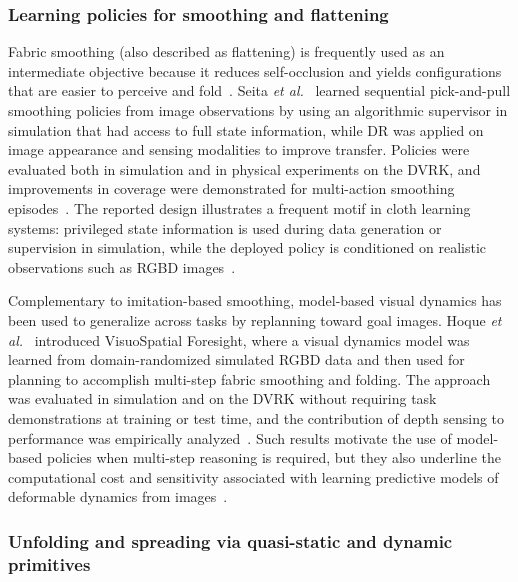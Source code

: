 \subsubsection{Learning policies for smoothing and flattening}

Fabric smoothing (also described as flattening) is frequently used as an intermediate objective because it reduces self-occlusion and yields configurations that are easier to perceive and fold~\cite{Longhini2025ClothReview}. Seita \emph{et al.}~\cite{Seita2020FabricSmoothing} learned sequential pick-and-pull smoothing policies from image observations by using an algorithmic supervisor in simulation that had access to full state information, while \ac{DR} was applied on image appearance and sensing modalities to improve transfer. Policies were evaluated both in simulation and in physical experiments on the \ac{DVRK}, and improvements in coverage were demonstrated for multi-action smoothing episodes~\cite{Seita2020FabricSmoothing}. The reported design illustrates a frequent motif in cloth learning systems: privileged state information is used during data generation or supervision in simulation, while the deployed policy is conditioned on realistic observations such as \ac{RGBD} images~\cite{Seita2020FabricSmoothing,Gu2023DeformableSurvey}.

Complementary to imitation-based smoothing, model-based visual dynamics has been used to generalize across tasks by replanning toward goal images. Hoque \emph{et al.}~\cite{Hoque2020VisuoSpatialForesight} introduced VisuoSpatial Foresight, where a visual dynamics model was learned from domain-randomized simulated \ac{RGBD} data and then used for planning to accomplish multi-step fabric smoothing and folding. The approach was evaluated in simulation and on the \ac{DVRK} without requiring task demonstrations at training or test time, and the contribution of depth sensing to performance was empirically analyzed~\cite{Hoque2020VisuoSpatialForesight}. Such results motivate the use of model-based policies when multi-step reasoning is required, but they also underline the computational cost and sensitivity associated with learning predictive models of deformable dynamics from images~\cite{Hoque2020VisuoSpatialForesight,Gu2023DeformableSurvey}.

\subsubsection{Unfolding and spreading via quasi-static and dynamic primitives}

